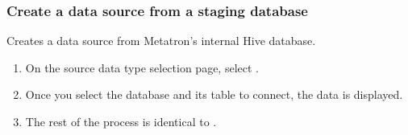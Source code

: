 \documentclass[letterpaper,10pt,english]{sphinxmanual}
\begin{document}
\subsubsection{Create a data source from a staging database}
\label{\detokenize{discovery/part02/create_a_data_source:stagingdb}}\label{\detokenize{discovery/part02/create_a_data_source:create-datasource-from-stagingdb}}
Creates a data source from Metatron’s internal Hive database.
\begin{enumerate}
\def\theenumi{\arabic{enumi}}
\def\labelenumi{\theenumi .}
\makeatletter\def\p@enumii{\p@enumi \theenumi .}\makeatother
\item {} 
On the source data type selection page, select .

\item {} 
Once you select the database and its table to connect, the data is displayed.
\begin{quote}

\begin{figure}[H]
\centering

\noindent{}
\end{figure}
\end{quote}

\item {} 
The rest of the process is identical to {\hyperref[\detokenize{discovery/part02/create_a_data_source:create-datasource-from-db}]{}}.
\begin{quote}

\begin{figure}[H]
\centering

\noindent{}
\end{figure}
\end{quote}

\end{enumerate}
\end{document}
